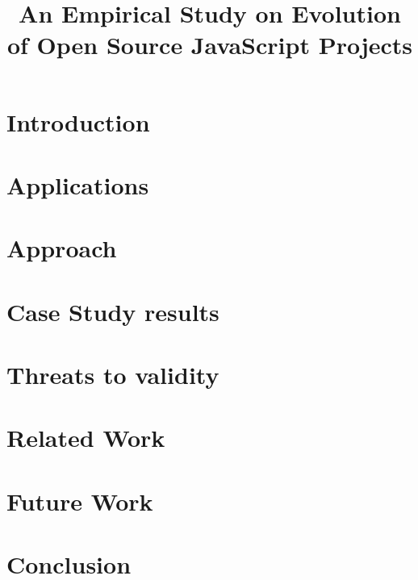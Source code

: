 \documentclass[conference]{IEEEtran}
\begin{document}
\title{An Empirical Study on Evolution of Open Source JavaScript Projects}

\author{
	
	}

\maketitle

\section{Introduction}
\label{sec:introduction}


\section{Applications}
\label{sec:applications}


\section{Approach}
\label{sec:approach}

	
\section{Case Study results}
\label{sec:results}


\section{Threats to validity}
\label{sec:threats}


\section{Related Work}
\label{sec:related_work}


\section{Future Work}
\label{sec:future}


\section{Conclusion}
\label{sec:conclusion}




\end{document}

